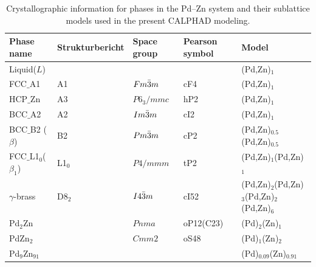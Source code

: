 \begin{table}[H]
    \footnotesize
    \centering
    \caption{Crystallographic information for phases in the Pd–Zn system and their sublattice models used in the present CALPHAD modeling.}
    \begin{tabular}{>{\raggedright\arraybackslash}m{2.5cm}>{\raggedright\arraybackslash}m{2.5cm}>{\raggedright\arraybackslash}m{2cm}>{\raggedright\arraybackslash}m{2.5cm}>{\raggedright\arraybackslash}m{6cm}}
        \hline
         \textbf{Phase name} & \textbf{Strukturbericht} & \textbf{Space group} & \textbf{Pearson symbol} & \textbf{Model} \\
        \hline
         Liquid($L$) &  &  &  & (Pd,Zn)$_1$ \\
         FCC$\_$A1 & A1 & $Fm\Bar{3}m$ & cF4 & (Pd,Zn)$_1$ \\
         HCP$\_$Zn & A3 & $P6_3/mmc$ & hP2 & (Pd,Zn)$_1$ \\
         BCC$\_$A2 & A2 & $Im\Bar{3}m$ & cI2 & (Pd,Zn)$_1$ \\
         BCC$\_$B2 ($\beta$) & B2 & $Pm\Bar{3}m$ & cP2 & (Pd,Zn)$_{0.5}$(Pd,Zn)$_{0.5}$ \\
         FCC$\_$L1$_0$($\beta_1$) & L1$_0$ & $P4/mmm$ & tP2 & (Pd,Zn)$_1$(Pd,Zn)$_1$ \\
         $\gamma$-brass & D8$_2$ & $I4\Bar{3}m$ & cI52 & (Pd,Zn)$_2$(Pd,Zn)$_3$(Pd,Zn)$_2$(Pd,Zn)$_6$ \\
         Pd$_2$Zn &  & $Pnma$ & oP12(C23) & (Pd)$_2$(Zn)$_1$ \\
         PdZn$_2$ &  & $Cmm2$ & oS48 & (Pd)$_1$(Zn)$_2$ \\
         Pd$_9$Zn$_{91}$ &  &  &  & (Pd)$_{0.09}$(Zn)$_{0.91}$ \\
        \hline
    \end{tabular}
    \label{intermetallics:PdZn_phases}
\end{table}

